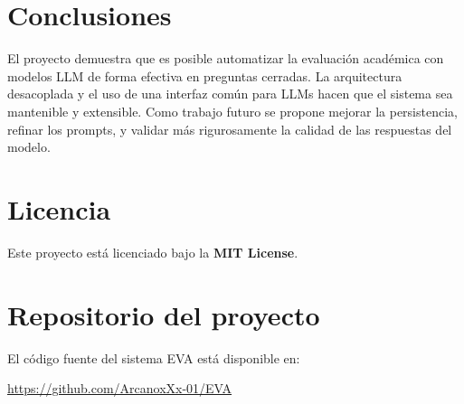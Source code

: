 \documentclass[12pt]{article}
\begin{document}
\section{Conclusiones}
El proyecto demuestra que es posible automatizar la evaluación académica con modelos LLM de forma efectiva en preguntas cerradas. La arquitectura desacoplada y el uso de una interfaz común para LLMs hacen que el sistema sea mantenible y extensible. Como trabajo futuro se propone mejorar la persistencia, refinar los prompts, y validar más rigurosamente la calidad de las respuestas del modelo.

\section*{Licencia}
Este proyecto está licenciado bajo la \textbf{MIT License}.

\section*{Repositorio del proyecto}
El código fuente del sistema EVA está disponible en:

\url{https://github.com/ArcanoxXx-01/EVA}
\end{document}
